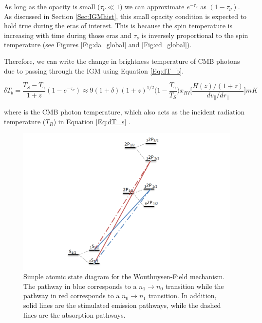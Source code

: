 As long as the opacity is small ($\tau_\nu \ll 1$) we can approximate $e^{-\tau_\nu}$ as $(1-\tau_\nu)$. As discussed in Section \ref{Sec:IGMhist}, this small opacity condition is expected to hold true during the eras of interest. This is because the spin temperature is increasing with time during those eras and $\tau_\nu$ is inversely proportional to the spin temperature (see Figures \ref{Fig:da_global} and \ref{Fig:cd_global}).

Therefore, we can write the change in brightness temperature of CMB photons due to passing through the IGM using Equation \ref{Eq:dT_b}.

\begin{equation}\label{Eq:dT_b}
\delta T_b = \frac{T_S - T_\gamma}{1+z}(1-e^{-\tau_\nu}) \approx 9 (1+\delta) (1+z)^{1/2} \Big(1-\frac{T_\gamma}{T_S}\Big) x_{HI} \Big[ \frac{H(z)/(1+z)}{dv_{\parallel}/dr_{\parallel}} \Big] mK
\end{equation}

where \tg is the CMB photon temperature, which also acts as the incident radiation temperature ($T_R$) in Equation \ref{Eq:dT_s} \cite{furlanetto_2006}. 

\begin{figure}[htb]
\begin{center}
\includegraphics[width=0.95\linewidth]{Introduction/figures/wfm_states.png}
\caption{Simple atomic state diagram for the Wouthuysen-Field mechanism. The pathway in blue corresponds to a $n_1 \rightarrow n_0$ transition while the pathway in red corresponds to a $n_0 \rightarrow n_1$ transition. In addition, solid lines are the stimulated emission pathways, while the dashed lines are the absorption pathways.}
\label{Fig:wfm_states}
\end{center}
\end{figure}


